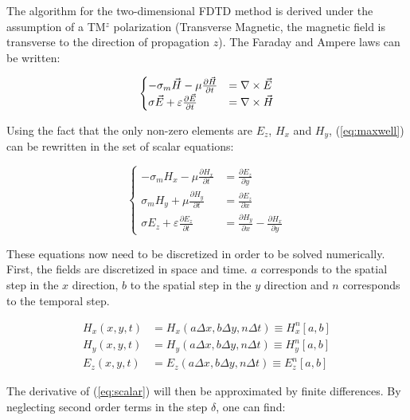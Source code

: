 The algorithm for the two-dimensional FDTD method is derived under the assumption of a TM$^z$ polarization (Transverse Magnetic, the magnetic field is transverse to the direction of propagation $z$). The Faraday and Ampere laws can be written:

\begin{equation}
\begin{cases}
	-\sigma_m\vec{H} -\mu \frac{\partial \vec{H}}{\partial t} &=
	\nabla \times \vec{E}	\\
	\sigma \vec{E} + \varepsilon \frac{\partial \vec{E}}{\partial t} &=
	\nabla \times \vec{H}
\end{cases}	
\label{eq:maxwell}
\end{equation}

Using the fact that the only non-zero elements are $E_z$, $H_x$ and $H_y$, (\ref{eq:maxwell}) can be rewritten in the set of scalar equations:

\begin{equation}
	\begin{cases}
		-\sigma_m H_x - \mu\frac{\partial H_x}{\partial t} &=
		\frac{\partial E_z}{\partial y}
		\\
		\sigma_m H_y + \mu\frac{\partial H_y}{\partial t} &=
		\frac{\partial E_z}{\partial x}
		\\
		\sigma E_z + \varepsilon\frac{\partial E_z}{\partial t} &=
		\frac{\partial H_y}{\partial x}
		-\frac{\partial H_x}{\partial y} 
	\end{cases}	
	\label{eq:scalar}
\end{equation}

These equations now need to be discretized in order to be solved numerically. First, the fields are discretized in space and time. $a$ corresponds to the spatial step in the $x$ direction, $b$ to the spatial step in the $y$ direction and $n$ corresponds to the temporal step.

\begin{equation}
    \begin{aligned}
		H_x(x,y,t) &= H_x(a\Delta x, b \Delta y, n \Delta t) \equiv
		H_x^n[a,b]  \\
		H_y(x,y,t) &= H_y(a\Delta x, b \Delta y, n \Delta t) \equiv
		H_y^n[a,b]  \\
		E_z(x,y,t) &= E_z(a\Delta x, b \Delta y, n \Delta t) \equiv
		E_z^n[a,b]
	\end{aligned}
\end{equation}

The derivative of (\ref{eq:scalar}) will then be approximated by finite differences. By neglecting second order terms in the step $\delta$, one can find:

